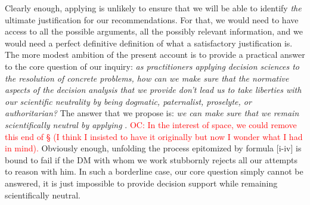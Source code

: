\documentclass[preprint, french, english, 11pt, authoryear]{elsarticle}%
\newcommand{\commentOC}[1]{\textcolor{red}{OC: #1}}
\begin{document}
Clearly enough, applying  is unlikely to ensure that we will be able to identify \emph{the} ultimate justification for our recommendations.
For that, we would need to have access to all the possible arguments, all the possibly relevant information, and we would need a perfect definitive definition of what a satisfactory justification is. 
The more modest ambition of the present account is to provide a practical answer to the core question of our inquiry: \emph{as practitioners applying decision sciences to the resolution of concrete problems, how can we make sure that the normative aspects of the decision analysis that we provide don't lead us to take liberties with our scientific neutrality by being dogmatic, paternalist, proselyte, or authoritarian?}
The answer that we propose is: \emph{we can make sure that we remain scientifically neutral by applying }.
\commentOC{In the interest of space, we could remove this end of § (I think I insisted to have it originally but now I wonder what I had in mind).} Obviously enough, unfolding the process epitomized by formula [i-iv] is bound to fail if the \ac{DM} with whom we work stubbornly rejects all our attempts to reason with him.
In such a borderline case, our core question simply cannot be answered, it is just impossible to provide decision support while remaining scientifically neutral.
\end{document}
